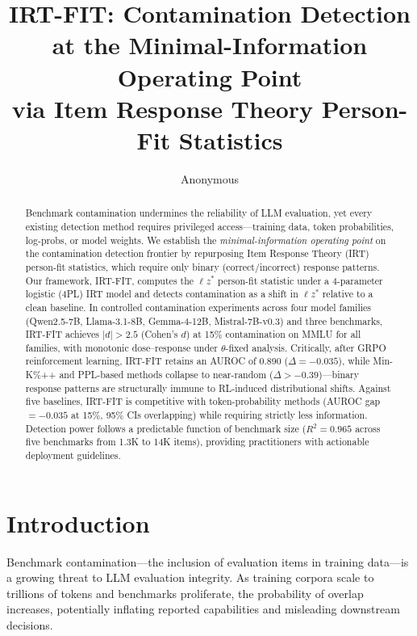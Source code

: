 \documentclass[11pt,a4paper]{article}
\title{IRT-FIT: Contamination Detection at the Minimal-Information Operating Point\\via Item Response Theory Person-Fit Statistics}
\author{Anonymous}
\date{}
\newcommand{\lzstar}{$\ell z^*$}
\begin{document}
\maketitle

\begin{abstract}
Benchmark contamination undermines the reliability of LLM evaluation, yet every existing detection method requires privileged access---training data, token probabilities, log-probs, or model weights.
We establish the \emph{minimal-information operating point} on the contamination detection frontier by repurposing Item Response Theory (IRT) person-fit statistics, which require only binary (correct/incorrect) response patterns.
Our framework, IRT-FIT, computes the \lzstar{} person-fit statistic under a 4-parameter logistic (4PL) IRT model and detects contamination as a shift in \lzstar{} relative to a clean baseline.
In controlled contamination experiments across four model families (Qwen2.5-7B, Llama-3.1-8B, Gemma-4-12B, Mistral-7B-v0.3) and three benchmarks, IRT-FIT achieves $|d| > 2.5$ (Cohen's $d$) at 15\% contamination on MMLU for all families, with monotonic dose--response under $\theta$-fixed analysis.
Critically, after GRPO reinforcement learning, IRT-FIT retains an AUROC of 0.890 ($\Delta = -0.035$), while Min-K\%++ and PPL-based methods collapse to near-random ($\Delta > -0.39$)---binary response patterns are structurally immune to RL-induced distributional shifts.
Against five baselines, IRT-FIT is competitive with token-probability methods (AUROC gap $= -0.035$ at 15\%, 95\% CIs overlapping) while requiring strictly less information.
Detection power follows a predictable function of benchmark size ($R^2 = 0.965$ across five benchmarks from 1.3K to 14K items), providing practitioners with actionable deployment guidelines.
\end{abstract}

\section{Introduction}

Benchmark contamination---the inclusion of evaluation items in training data---is a growing threat to LLM evaluation integrity.
As training corpora scale to trillions of tokens and benchmarks proliferate, the probability of overlap increases, potentially inflating reported capabilities and misleading downstream decisions.
\end{document}
